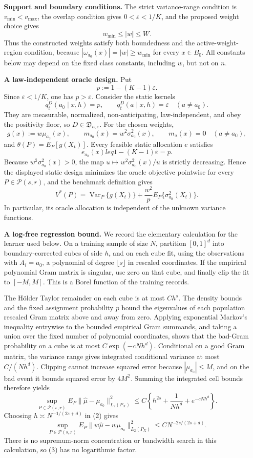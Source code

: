 \textbf{Support and boundary conditions.}
The strict variance-range condition is \(v_{\min}<v_{\max}\), the overlap condition gives \(0<\varepsilon<1/K\), and the proposed weight choice gives
\[
w_{\min}\leq |w|\leq W.
\]
Thus the constructed weights satisfy both boundedness and the active-weight-region condition, because \(|\omega_{a_0}(x)|=|w|\geq w_{\min}\) for every \(x\in B_0\).  All constants below may depend on the fixed class constants, including \(w\), but not on \(n\).

\textbf{A law-independent oracle design.}
Put
\[
p:=1-(K-1)\varepsilon.
\]
Since \(\varepsilon<1/K\), one has \(p>\varepsilon\).  Consider the static kernels
\[
q_t^D(a_0\mid x,h)=p,
\qquad
q_t^D(a\mid x,h)=\varepsilon\quad(a\neq a_0).
\]
They are measurable, normalized, non-anticipating, law-independent, and obey the positivity floor, so \(D\in\mathfrak D_{n,\varepsilon}\).  For the chosen weights,
\[
g(x):=w\mu_{a_0}(x),
\qquad
m_{a_0}(x)=w^2\sigma_{a_0}^2(x),
\qquad
m_a(x)=0\quad(a\neq a_0),
\]
and \(\theta(P)=E_P[g(X_t)]\).  Every feasible static allocation \(e\) satisfies
\[
e_{a_0}(x)leq 1-(K-1)\varepsilon=p.
\]
Because \(w^2\sigma_{a_0}^2(x)>0\), the map \(u\mapsto w^2\sigma_{a_0}^2(x)/u\) is strictly decreasing.  Hence the displayed static design minimizes the oracle objective pointwise for every \(P\in\mathcal P(s,r)\), and the benchmark definition gives
\[
V^*(P)=\operatorname{Var}_P\{g(X_t)\}
+\frac{w^2}{p}E_P\{\sigma_{a_0}^2(X_t)\}.
\tag{1}
\]
In particular, its oracle allocation is independent of the unknown variance functions.

\textbf{A log-free regression bound.}
We record the elementary calculation for the learner used below.  On a training sample of size \(N\), partition \([0,1]^d\) into boundary-corrected cubes of side \(h\), and on each cube fit, using the observations with \(A_i=a_0\), a polynomial of degree \(\lfloor s\rfloor\) in rescaled coordinates.  If the empirical polynomial Gram matrix is singular, use zero on that cube, and finally clip the fit to \([-M,M]\).  This is a Borel function of the training records.

The Hölder Taylor remainder on each cube is at most \(C h^s\).  The density bounds and the fixed assignment probability \(p\) bound the eigenvalues of each population rescaled Gram matrix above and away from zero.  Applying exponential Markov's inequality entrywise to the bounded empirical Gram summands, and taking a union over the fixed number of polynomial coordinates, shows that the bad-Gram probability on a cube is at most \(C\exp(-cNh^d)\).  Conditional on a good Gram matrix, the variance range gives integrated conditional variance at most \(C/(Nh^d)\).  Clipping cannot increase squared error because \(|\mu_{a_0}|\leq M\), and on the bad event it bounds squared error by \(4M^2\).  Summing the integrated cell bounds therefore yields
\[
\sup_{P\in\mathcal P(s,r)}
E_P\|\widehat\mu-\mu_{a_0}\|_{L_2(P_X)}^2
\leq C\left\{h^{2s}+\frac{1}{Nh^d}+e^{-cNh^d}\right\}.
\tag{2}
\]
Choosing \(h\asymp N^{-1/(2s+d)}\) in (2) gives
\[
\sup_{P\in\mathcal P(s,r)}
E_P\|w\widehat\mu-w\mu_{a_0}\|_{L_2(P_X)}^2
\leq C N^{-2s/(2s+d)}.
\tag{3}
\]
There is no supremum-norm concentration or bandwidth search in this calculation, so (3) has no logarithmic factor.

